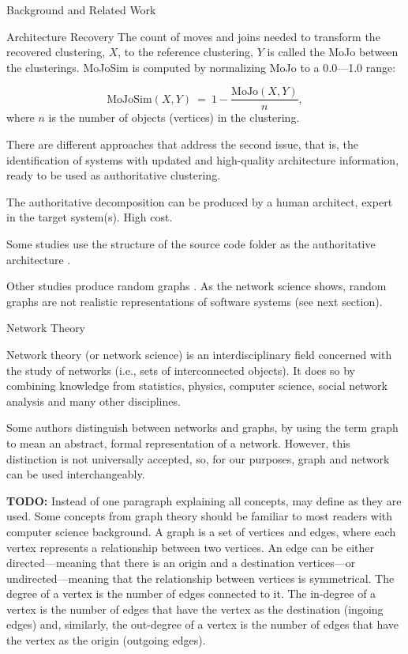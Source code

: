 \documentclass[11pt,twocolumn,a4paper,english]{article}
\newcommand{\TODO}{\textbf{TODO:} }
\begin{document}
\begin{section}{Background and Related Work}
\begin{subsection}{Architecture Recovery}
	The count of moves and joins needed to transform the recovered clustering, $X$, to the reference clustering, $Y$ is called the MoJo between the clusterings. MoJoSim is computed by normalizing MoJo to a 0.0---1.0 range:
	
	$$
	\mathrm{MoJoSim}(X, Y) ~=~ 1 - \frac{\mathrm{MoJo}(X, Y)}{n}\mathrm{,}
	$$
where $n$ is the number of objects (vertices) in the clustering.
	
	There are different approaches that address the second issue, that is, the identification of systems with updated and high-quality architecture information, ready to be used as authoritative clustering.
	
	The authoritative decomposition can be produced by a human architect, expert in the target system(s). High cost.
	
	Some studies use the structure of the source code folder as the authoritative architecture \cite{Bittencourt2009,Wu2005}.
	
	Other studies produce random graphs \cite{Mitchell2007}.  As the network science shows, random graphs are not realistic representations of software systems (see next section).
	
\end{subsection}

\begin{subsection}{Network Theory}
	
	Network theory (or network science) is an interdisciplinary field concerned with the study of networks (i.e., sets of interconnected objects). It does so by combining knowledge from statistics, physics, computer science, social network analysis and many other disciplines.

	Some authors distinguish between networks and graphs, by using the term graph to mean an abstract, formal representation of a network. However, this distinction is not universally accepted, so, for our purposes, graph and network can be used interchangeably.

	\TODO Instead of one paragraph explaining all concepts, may define as they are used.
	Some concepts from graph theory should be familiar to most readers with computer science background. A graph is a set of vertices and edges, where each vertex represents a relationship between two vertices. An edge can be either directed---meaning that there is an origin and a destination vertices---or undirected---meaning that the relationship between vertices is symmetrical. The degree of a vertex is the number of edges connected to it. The in-degree of a vertex is the number of edges that have the vertex as the destination (ingoing edges) and, similarly, the out-degree of a vertex is the number of edges that have the vertex as the origin (outgoing edges).


\end{subsection}
\end{section}
\end{document}
